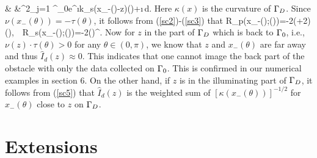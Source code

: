 \documentclass[12pt]{iopart}
\begin{document}
{\hskip-2.5cm& &\Im\sum^2_{j=1}
\int^\pi_0e^{\i k_s(x_-(\theta)-z)\cdot\tau(\theta)+\i\frac{}\,}d\theta.
\een
Here $\kappa(x)$ is the curvature of $\Gamma_D$. Since $\nu(x_-(\theta))=-\tau(\theta)$, it follows from (\ref{sc2})-(\ref{sc3}) that
\be\label{sc5}
R_p(x_-(\theta);\tau(\theta))=-2(\lam+2\mu)\tau(\theta),\ \ R_s(x_-(\theta);\tau(\theta))=-2\mu\tau(\theta)^\perp.
\ee
Now for $z$ in the part of $\Gamma_D$ which is back to $\Gamma_0$, i.e., $\nu(z)\cdot\tau(\theta)>0$ for any $\theta\in (0,\pi)$, we know that $z$ and $x_-(\theta)$ are far away and thus $\hat{I}_d(z)\approx0$. This indicates that one cannot image the back part of the obstacle with only the data collected on $\Gamma_0$. This is confirmed in our numerical examples in section 6.
On the other hand, if $z$ is in the illuminating part of $\Gamma_D$, it follows from (\ref{sc5}) that $\hat I_d(z)$ is the weighted sum of $[\kappa(x_-(\theta))]^{-1/2}$ for $x_-(\theta)$ close to $z$ on $\Gamma_D$.

\section{Extensions}

}
\end{document}
